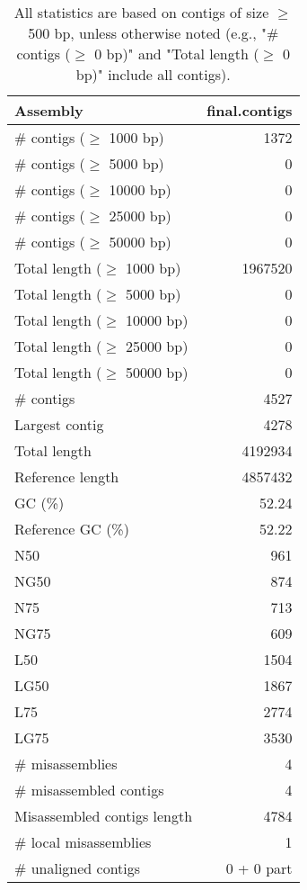 \documentclass[12pt,a4paper]{article}
\begin{document}
\begin{table}[ht]
\begin{center}
\caption{All statistics are based on contigs of size $\geq$ 500 bp, unless otherwise noted (e.g., "\# contigs ($\geq$ 0 bp)" and "Total length ($\geq$ 0 bp)" include all contigs).}
\begin{tabular}{|l*{1}{|r}|}
\hline
Assembly & final.contigs \\ \hline
\# contigs ($\geq$ 1000 bp) & 1372 \\ \hline
\# contigs ($\geq$ 5000 bp) & 0 \\ \hline
\# contigs ($\geq$ 10000 bp) & 0 \\ \hline
\# contigs ($\geq$ 25000 bp) & 0 \\ \hline
\# contigs ($\geq$ 50000 bp) & 0 \\ \hline
Total length ($\geq$ 1000 bp) & 1967520 \\ \hline
Total length ($\geq$ 5000 bp) & 0 \\ \hline
Total length ($\geq$ 10000 bp) & 0 \\ \hline
Total length ($\geq$ 25000 bp) & 0 \\ \hline
Total length ($\geq$ 50000 bp) & 0 \\ \hline
\# contigs & 4527 \\ \hline
Largest contig & 4278 \\ \hline
Total length & 4192934 \\ \hline
Reference length & 4857432 \\ \hline
GC (\%) & 52.24 \\ \hline
Reference GC (\%) & 52.22 \\ \hline
N50 & 961 \\ \hline
NG50 & 874 \\ \hline
N75 & 713 \\ \hline
NG75 & 609 \\ \hline
L50 & 1504 \\ \hline
LG50 & 1867 \\ \hline
L75 & 2774 \\ \hline
LG75 & 3530 \\ \hline
\# misassemblies & 4 \\ \hline
\# misassembled contigs & 4 \\ \hline
Misassembled contigs length & 4784 \\ \hline
\# local misassemblies & 1 \\ \hline
\# unaligned contigs & 0 + 0 part \\ \hline

\end{tabular}
\end{center}
\end{table}
\end{document}
